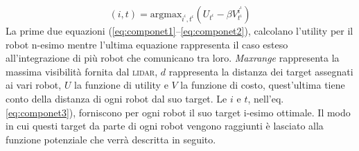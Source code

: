 \begin{equation}
\label{eq:componet3}
(i,t) = \text{argmax}_{i^{\iota},t^{\iota}} (U_{t^{\iota}}  -\beta V^{i^{\iota}}_{t^{\iota}} )
\end{equation}
%
La prime due equazioni (\ref{eq:componet1}--\ref{eq:componet2}), calcolano
l'utility per il robot n-esimo mentre l'ultima equazione rappresenta il caso
esteso all'integrazione di più robot che comunicano tra loro.
\emph{Maxrange} rappresenta la massima visibilità fornita dal \textsc{lidar},
$d$ rappresenta la distanza dei target assegnati ai vari robot, $U$ la funzione
di utility e $V$ la funzione di costo, quest'ultima tiene conto della distanza
di ogni robot dal suo target. 
Le $i$ e $t$, nell'eq. \eqref{eq:componet3}), forniscono per ogni robot il suo
target i-esimo ottimale.
Il modo in cui questi target da parte di ogni robot vengono raggiunti è
lasciato alla funzione potenziale che verrà descritta in seguito.
